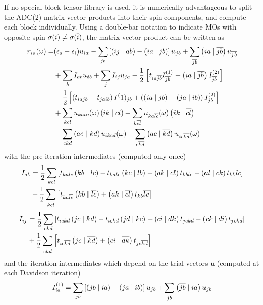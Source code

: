 If no special block tensor library is used, it is numerically advantageous to split the ADC(2) matrix-vector products into their spin-components, and compute each block individually. Using a double-bar notation to indicate MOs with opposite spin $\sigma(i) \neq \sigma(\overline{i})$, the matrix-vector product can be written as
\begin{equation}
\begin{split}
r_{ia}( \omega) = &(\epsilon_a - \epsilon_i) u_{ia} - \sum_{jb} \left[ \left( ij \mid ab \right) - \left( ia \mid jb \right) \right] u_{jb} + \sum_{\overline{jb}} \left( ia \mid \overline{jb} \right) u_{\overline{jb}} \\
&+ \sum_b I_{ab} u_{ib} + \sum_{j} I_{ij} u_{ja} - \frac{1}{2} \left[ t_{ia\overline{jb}} I^{(1)}_{\overline{jb}} + \left( ia \mid \overline{jb} \right) I_{\overline{jb}}^{(2)} \right] \\
&- \frac{1}{2} \left[ \left( t_{iajb} - t_{jaib} \right) I^(1)_{jb} + \left(\left( ia \mid jb \right) - \left( ja \mid ib \right) \right) I_{jb}^{(2)} \right] \\
&+ \sum_{kcl} u_{kalc}(\omega) \left( ik \mid cl \right) + \sum_{k\overline{cl}} u_{ka\overline{lc}}(\omega) \left( ik \mid \overline{cl} \right) \\
&- \sum_{ckd} \left( ac \mid kd \right) u_{ikcd}(\omega) - \sum_{c\overline{kd}} \left( ac \mid \overline{kd} \right) u_{ic\overline{kd}}(\omega)
\end{split}
\end{equation}  
\noindent with the pre-iteration intermediates (computed only once)
\begin{equation}
\begin{split}
I_{ab} &= \frac{1}{2} \sum_{kcl} \left[ t_{kalc} \left( kb \mid lc \right) - t_{kalc} \left( kc \mid lb \right) + \left( ak \mid cl \right) t_{kblc} - \left( al \mid ck \right) t_{kb}{lc} \right] \\
&+ \frac{1}{2} \sum_{k\overline{cl}} \left[ t_{ka\overline{lc}} \left( kb \mid \overline{lc} \right) + \left( ak \mid \overline{cl} \right) t_{kb}{\overline{lc}} \right] 
\end{split}
\end{equation}
\begin{equation}
\begin{split}
I_{ij} &= \frac{1}{2} \sum_{ckd} \left[ t_{ickd} \left( jc \mid kd \right) - t_{ickd} \left( jd \mid kc \right) + \left( ci \mid dk \right) t_{jckd} - \left( ck \mid di \right) t_{jckd} \right] \\
&+ \frac{1}{2} \sum_{c\overline{kd}} \left[ t_{ic\overline{kd}} \left( jc \mid \overline{kd} \right) + \left( ci \mid \overline{dk} \right) t_{jc\overline{kd}} \right]  
\end{split}
\end{equation}
\noindent and the iteration intermediates which depend on the trial vectors $\mathbf{u}$ (computed at each Davidson iteration)
\begin{equation}
I_{ia}^{(1)} = \sum_{jb} \left[ \left( jb \mid ia \right) - \left( ja \mid ib \right) \right] u_{jb} + \sum_{\overline{jb}} \left( \overline{jb} \mid ia \right) u_{jb}
\end{equation}
